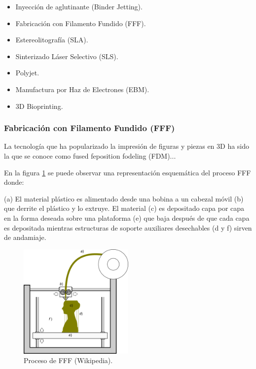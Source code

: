 \begin{itemize}
    
    \item Inyección de aglutinante (Binder Jetting).
    \item Fabricación con Filamento Fundido (FFF).
    \item Estereolitografía (SLA).
    \item Sinterizado  Láser Selectivo (SLS). 
    \item Polyjet.
    \item Manufactura por Haz de Electrones (EBM).
    \item 3D Bioprinting.
     
\end{itemize}

\subsubsection{Fabricación con Filamento Fundido (FFF)}

La tecnología que ha popularizado la impresión de figuras y piezas en 3D ha sido la que se conoce como fused feposition fodeling (FDM)...

En la figura \ref{fig2} se puede observar una representación esquemática del proceso FFF donde: 

(a) El material plástico es alimentado desde una bobina a un cabezal móvil  (b) que derrite el plástico y lo extruye. El material (c) es depositado capa por capa en la forma deseada sobre una plataforma (e) que baja después de que cada capa es depositada mientras estructuras de soporte auxiliares desechables (d y f) sirven de andamiaje.   
       
\begin{figure}[htbp!]
    \centering
    \includegraphics[width=0.5\textwidth]{./graficos/FDM.png}
    \caption{Proceso de FFF (Wikipedia).}
    \label{fig2}
\end{figure}

